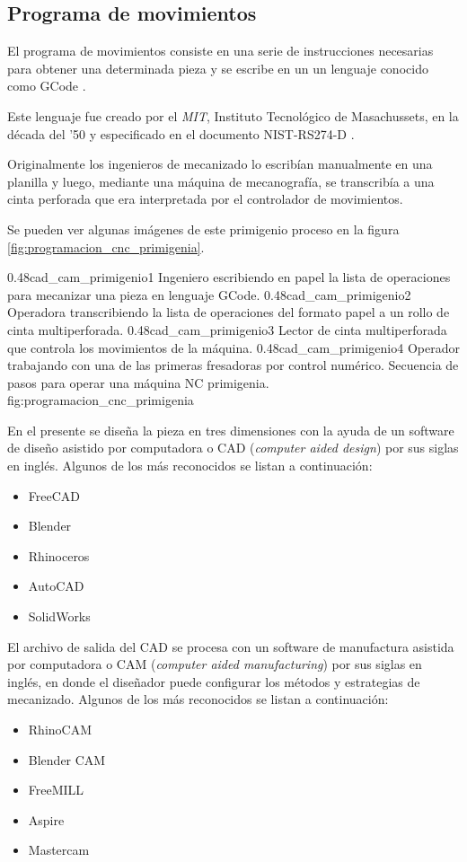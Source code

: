 \subsection{Programa de movimientos}
   El programa de movimientos consiste en una serie de instrucciones necesarias para obtener una determinada pieza y se escribe en un un lenguaje conocido como GCode \citep{WEBSITE:gcode_wiki}.\par
   Este lenguaje fue creado por el \textit{MIT}, Instituto Tecnológico de Masachussets, en la década del '50 y especificado en el documento NIST-RS274-D \citep{rs274}.\par
Originalmente los ingenieros de mecanizado lo escribían manualmente en una planilla y luego, mediante una máquina de mecanografía, se transcribía a una cinta perforada que era interpretada por el controlador de movimientos.\par

Se pueden ver algunas imágenes de este primigenio proceso en la figura \ref{fig:programacion_cnc_primigenia}.

\subfigtwotwo
          {0.48}{cad_cam_primigenio1} {Ingeniero escribiendo en papel la lista de operaciones para mecanizar una pieza en lenguaje GCode.}
          {0.48}{cad_cam_primigenio2} {Operadora transcribiendo la lista de operaciones del formato papel a un rollo de cinta multiperforada.}
          {0.48}{cad_cam_primigenio3} {Lector de cinta multiperforada que controla los movimientos de la máquina.}
          {0.48}{cad_cam_primigenio4} {Operador trabajando con una de las primeras fresadoras por control numérico.}
          {Secuencia de pasos para operar una máquina NC primigenia.}
          {fig:programacion_cnc_primigenia}

          En el presente se diseña la pieza en tres dimensiones con la ayuda de un software de diseño asistido por computadora o CAD (\textit{computer aided design}) por sus siglas en inglés. Algunos de los más reconocidos se listan a continuación:
          \begin{itemize}
             \item{FreeCAD}
             \item{Blender}
             \item{Rhinoceros}
             \item{AutoCAD}
             \item{SolidWorks}
          \end{itemize}
   El archivo de salida del CAD se procesa con un software de manufactura asistida por computadora o CAM (\textit{computer aided manufacturing}) por sus siglas en inglés, en donde el diseñador puede configurar los métodos y estrategias de mecanizado. Algunos de los más reconocidos se listan a continuación:
          \begin{itemize}
             \item{RhinoCAM}
             \item{Blender CAM}
             \item{FreeMILL}
             \item{Aspire}
             \item{Mastercam}
          \end{itemize}

